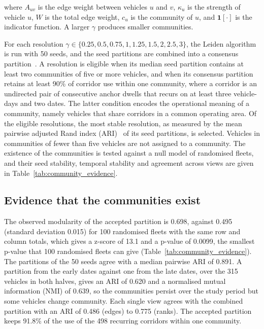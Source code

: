 \noindent where \( A_{uv} \) is the edge weight between vehicles \( u \) and \( v \), \( \kappa_u \) is the strength of vehicle \( u \), \( W \) is the total edge weight, \( c_u \) is the community of \( u \), and \( \mathbf{1}[\cdot] \) is the indicator function. A larger \( \gamma \) produces smaller communities.

For each resolution \( \gamma \in \{0.25, 0.5, 0.75, 1, 1.25, 1.5, 2, 2.5, 3\} \), the Leiden algorithm is run with 50 seeds, and the seed partitions are combined into a consensus partition~\cite{lancichinetti2012_consensus_clustering}. A resolution is eligible when its median seed partition contains at least two communities of five or more vehicles, and when its consensus partition retains at least 90\% of corridor use within one community, where a corridor is an undirected pair of consecutive anchor dwells that recurs on at least three vehicle-days and two dates. The latter condition encodes the operational meaning of a community, namely vehicles that share corridors in a common operating area. Of the eligible resolutions, the most stable resolution, as measured by the mean pairwise adjusted Rand index (ARI)~\cite{hubert1985_comparing_partitions} of its seed partitions, is selected. Vehicles in communities of fewer than five vehicles are not assigned to a community. The existence of the communities is tested against a null model of randomised fleets, and their seed stability, temporal stability and agreement across views are given in Table~\ref{tab:community_evidence}.

\subsection{Evidence that the communities exist}

The observed modularity of the accepted partition is 0.698, against 0.495 (standard deviation 0.015) for 100 randomised fleets with the same row and column totals, which gives a z-score of 13.1 and a p-value of 0.0099, the smallest p-value that 100 randomised fleets can give (Table~\ref{tab:community_evidence}). The partitions of the 50 seeds agree with a median pairwise ARI of 0.891. A partition from the early dates against one from the late dates, over the 315 vehicles in both halves, gives an ARI of 0.620 and a normalised mutual information (NMI) of 0.639, so the communities persist over the study period but some vehicles change community. Each single view agrees with the combined partition with an ARI of 0.486 (edges) to 0.775 (ranks). The accepted partition keeps 91.8\% of the use of the 498 recurring corridors within one community.

